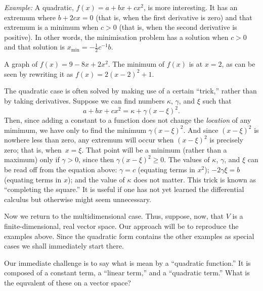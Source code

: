 \documentclass[10pt, a4paper]{article}
\newcommand{\eg}{\emph{Example:}}
\begin{document}
\eg{} A quadratic, $f(x) = a + bx + cx^2$, is more interesting. It has
an extremum where $b +2cx=0$ (that is, when the first derivative is
zero) and that extremum is a minimum when $c>0$ (that is, when the
second derivative is positive). In other words, the minimisation
problem has a solution when $c>0$ and that solution is $x_\text{min}=
-\frac{1}{2}c^{-1}b$.

\begin{marginfigure}
  \begin{center}
  \end{center}
\caption{A graph of $f(x) = 9 - 8x + 2x^2$. The minimum of $f(x)$ is
  at $x=2$, as can be seen by rewriting it as $f(x) = 2{(x-2)}^2+1$.}
\end{marginfigure}

The quadratic case is often solved by making use of a certain “trick,”
rather than by taking derivatives. Suppose we can find numbers $\kappa$,
$\gamma$, and $\xi$ such that
\begin{equation*}
  a + bx + cx^2 = \kappa + \gamma{(x - \xi)}^2.
\end{equation*}
Then, since adding a constant to a function does not change the
\emph{location} of any mimimum, we have only to find the minimum
$\gamma{(x-\xi)}^2$. And since ${(x-\xi)}^2$ is nowhere less than zero, any
extremum will occur when ${(x-\xi)}^2$ is precisely zero; that is,
when~$x = \xi$. That point will be a minimum (rather than a maximum)
only if $\gamma>0$, since then $\gamma{(x-\xi)}^2\geq 0$. The values of $\kappa$, $\gamma$, and
$\xi$ can be read off from the equation above: $\gamma=c$ (equating terms in
$x^2$); $-2\gamma\xi=b$ (equating terms in $x$); and the value of $\kappa$ does
not matter. This trick is known as “completing the square.” It is
useful if one has not yet learned the differential calculus but
otherwise might seem unnecessary.

Now we return to the multidimensional case. Thus, suppose, now, that
$V$ is a finite-dimensional, real vector space. Our approach will be
to reproduce the examples above. Since the quadratic form contains the
other examples as special cases we shall immediately start there. 

Our immediate challenge is to say what is mean by a “quadratic
function.” It is composed of a constant term, a “linear term,” and a
“quadratic term.” What is the equvalent of these on a vector space?
\end{document}
